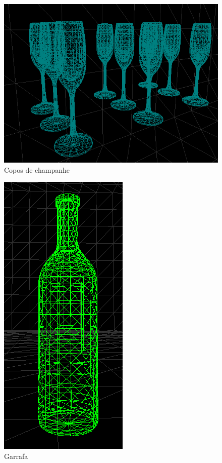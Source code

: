 \documentclass[a5paper,onecolumn, 11pt]{article}
\begin{document}
\begin{description}
\begin{figure}[!htb]
    \includegraphics[scale=0.9]{champanhe.png}
    \caption{Copos de champanhe}
\end{figure}
\begin{figure}[!htb]
    \centering
    \includegraphics[scale=0.7]{garrafa.png}
    \caption{Garrafa}
\end{figure}


\end{description}
\end{document}
